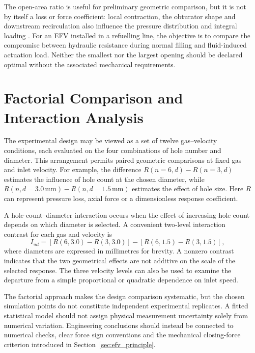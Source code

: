 The open-area ratio is useful for preliminary geometric comparison, but it is not by itself a loss or force coefficient: local contraction, the obturator shape and downstream recirculation also influence the pressure distribution and integral loading \cite{white2016,crane410}. For an EFV installed in a refuelling line, the objective is to compare the compromise between hydraulic resistance during normal filling and fluid-induced actuation load. Neither the smallest nor the largest opening should be declared optimal without the associated mechanical requirements.


\section{Factorial Comparison and Interaction Analysis}
\label{sec:factorial_analysis}

The experimental design may be viewed as a set of twelve gas--velocity conditions, each evaluated on the four combinations of hole number and diameter. This arrangement permits paired geometric comparisons at fixed gas and inlet velocity. For example, the difference $R(n=6,d)-R(n=3,d)$ estimates the influence of hole count at the chosen diameter, while $R(n,d=3.0\,\mathrm{mm})-R(n,d=1.5\,\mathrm{mm})$ estimates the effect of hole size. Here $R$ can represent pressure loss, axial force or a dimensionless response coefficient.

A hole-count--diameter interaction occurs when the effect of increasing hole count depends on which diameter is selected. A convenient two-level interaction contrast for each gas and velocity is
\begin{equation}
I_{nd}=
\left[R(6,3.0)-R(3,3.0)\right]-
\left[R(6,1.5)-R(3,1.5)\right],
\label{eq:hole_interaction}
\end{equation}
where diameters are expressed in millimetres for brevity. A nonzero contrast indicates that the two geometrical effects are not additive on the scale of the selected response. The three velocity levels can also be used to examine the departure from a simple proportional or quadratic dependence on inlet speed.

The factorial approach makes the design comparison systematic, but the chosen simulation points do not constitute independent experimental replicates. A fitted statistical model should not assign physical measurement uncertainty solely from numerical variation. Engineering conclusions should instead be connected to numerical checks, clear force sign conventions and the mechanical closing-force criterion introduced in Section~\ref{sec:efv_principle}.

